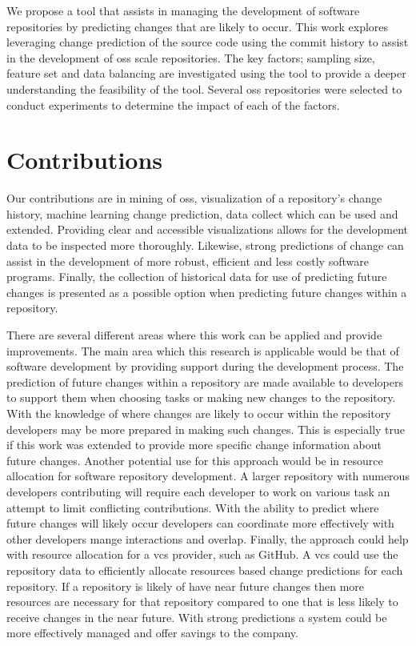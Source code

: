 
We propose a tool that assists in managing the development of software repositories by predicting changes that are likely to occur. This work explores leveraging change prediction of the source code using the commit history to assist in the development of \gls{oss} scale repositories. The key factors; sampling size, feature set and data balancing are investigated using the tool to provide a deeper understanding the feasibility of the tool. Several \gls{oss} repositories were selected to conduct experiments to determine the impact of each of the factors.

\section{Contributions}

Our contributions are in mining of \gls{oss}, visualization of a repository's change history, machine learning change prediction, data collect which can be used and extended. Providing clear and accessible visualizations allows for the development data to be inspected more thoroughly. Likewise, strong predictions of change can assist in the development of more robust, efficient and less costly software programs. Finally, the collection of historical data for use of predicting future changes is presented as a possible option when predicting future changes within a repository.

There are several different areas where this work can be applied and provide improvements. The main area which this research is applicable would be that of software development by providing support during the development process. The prediction of future changes within a repository are made available to developers to support them when choosing tasks or making new changes to the repository. With the knowledge of where changes are likely to occur within the repository developers may be more prepared in making such changes. This is especially true if this work was extended to provide more specific change information about future changes. Another potential use for this approach would be in resource allocation for software repository development. A larger repository with numerous developers contributing will require each developer to work on various task an attempt to limit conflicting contributions. With the ability to predict where future changes will likely occur developers can coordinate more effectively with other developers mange interactions and overlap. Finally, the approach could help with resource allocation for a \gls{vcs} provider, such as GitHub. A \gls{vcs} could use the repository data to efficiently allocate resources based change predictions for each repository. If a repository is likely of have near future changes then more resources are necessary for that repository compared to one that is less likely to receive changes in the near future. With strong predictions a system could be more effectively managed and offer savings to the company.

